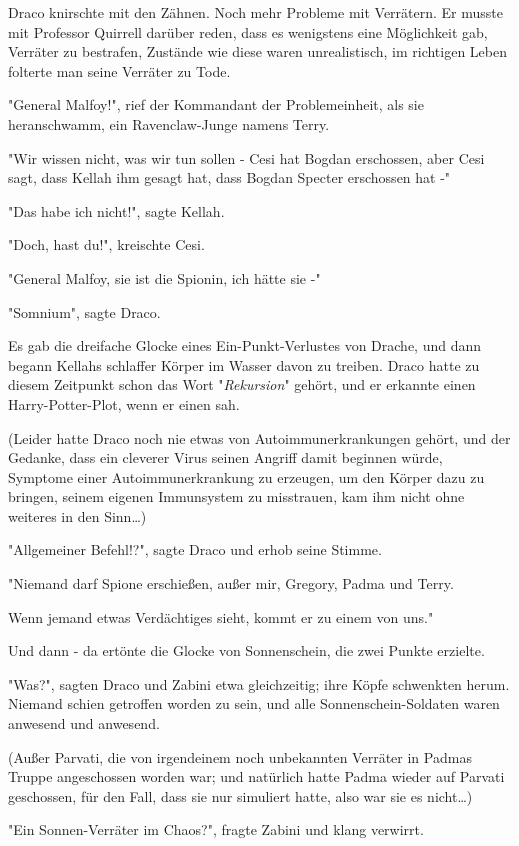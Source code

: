{Draco knirschte mit den Zähnen. Noch mehr Probleme mit Verrätern. Er musste mit Professor Quirrell darüber reden, dass es wenigstens eine Möglichkeit gab, Verräter zu bestrafen, Zustände wie diese waren unrealistisch, im richtigen Leben folterte man seine Verräter zu Tode.

"General Malfoy!", rief der Kommandant der Problemeinheit, als sie heranschwamm, ein Ravenclaw-Junge namens Terry.

"Wir wissen nicht, was wir tun sollen - Cesi hat Bogdan erschossen, aber Cesi sagt, dass Kellah ihm gesagt hat, dass Bogdan Specter erschossen hat -"

"Das habe ich nicht!", sagte Kellah.

"Doch, hast du!", kreischte Cesi.

"General Malfoy, sie ist die Spionin, ich hätte sie -"

"Somnium", sagte Draco.

Es gab die dreifache Glocke eines Ein-Punkt-Verlustes von Drache, und dann begann Kellahs schlaffer Körper im Wasser davon zu treiben. Draco hatte zu diesem Zeitpunkt schon das Wort "\emph{Rekursion}" gehört, und er erkannte einen Harry-Potter-Plot, wenn er einen sah.

(Leider hatte Draco noch nie etwas von Autoimmunerkrankungen gehört, und der Gedanke, dass ein cleverer Virus seinen Angriff damit beginnen würde, Symptome einer Autoimmunerkrankung zu erzeugen, um den Körper dazu zu bringen, seinem eigenen Immunsystem zu misstrauen, kam ihm nicht ohne weiteres in den Sinn…)

"Allgemeiner Befehl!?", sagte Draco und erhob seine Stimme.

"Niemand darf Spione erschießen, außer mir, Gregory, Padma und Terry.

Wenn jemand etwas Verdächtiges sieht, kommt er zu einem von uns."

Und dann - da ertönte die Glocke von Sonnenschein, die zwei Punkte erzielte.

"Was?", sagten Draco und Zabini etwa gleichzeitig; ihre Köpfe schwenkten herum. Niemand schien getroffen worden zu sein, und alle Sonnenschein-Soldaten waren anwesend und anwesend.

(Außer Parvati, die von irgendeinem noch unbekannten Verräter in Padmas Truppe angeschossen worden war; und natürlich hatte Padma wieder auf Parvati geschossen, für den Fall, dass sie nur simuliert hatte, also war sie es nicht…)

"Ein Sonnen-Verräter im Chaos?", fragte Zabini und klang verwirrt.

}
